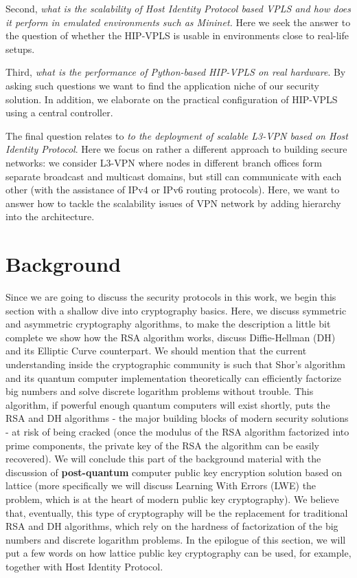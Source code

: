 Second, {\it what is the scalability of Host Identity Protocol based VPLS and how does 
it perform in emulated environments such as Mininet.} Here we seek the answer to 
the question of whether the HIP-VPLS is usable in environments close to real-life setups.

Third, {\it what is the performance of Python-based HIP-VPLS on real hardware}. By 
asking such questions we want to find the application niche of our security solution. In addition, 
we elaborate on the practical configuration of HIP-VPLS using a central controller.

The final question relates to {\it to the deployment of scalable L3-VPN 
based on Host Identity Protocol}. Here we focus on rather a different approach to building 
secure networks: we consider L3-VPN where nodes in different branch offices form separate 
broadcast and multicast domains, but still can communicate with each other (with the assistance of IPv4 or IPv6 
routing protocols). Here, we want to answer how to tackle the scalability issues of 
VPN network by adding hierarchy into the architecture.


\chapter{Background}

Since we are going to discuss the security protocols in this work, we begin 
this section with a shallow dive into cryptography basics. Here, we discuss 
symmetric and asymmetric cryptography algorithms, to make the description a 
little bit complete we show how the RSA algorithm works, discuss  
Diffie-Hellman (DH) and its Elliptic Curve counterpart. We should mention that the current 
understanding inside the cryptographic community is such that Shor’s algorithm and 
its quantum computer implementation theoretically 
can efficiently factorize big numbers and solve discrete logarithm problems without trouble. 
This algorithm, if powerful enough quantum computers will exist shortly, 
puts the RSA and DH algorithms - the major building blocks of modern security 
solutions - at risk of being cracked (once the modulus of the RSA algorithm factorized 
into prime components, the private key of the RSA 
the algorithm can be easily recovered). We will conclude this part of the background 
material with the discussion of {\bf post-quantum} computer public key encryption 
solution based on lattice (more specifically we will discuss Learning With Errors 
(LWE) the problem, which is at the heart of modern public key cryptography). 
We believe that, eventually, this type of cryptography will be 
the replacement for traditional RSA and DH algorithms, which rely on the hardness 
of factorization of the big numbers and discrete logarithm problems. In the epilogue of this 
section, we will put a few words on how lattice public key cryptography can be used, 
for example, together with Host Identity Protocol.

